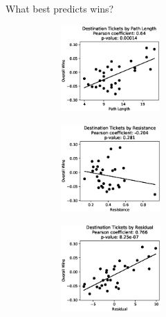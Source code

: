 \documentclass[12pt]{beamer}
\begin{document}
\begin{frame}{What best predicts wins?}
   \begin{figure}
    \centering
    \begin{subfigure}
        \centering
        \includegraphics[height=1.3in]{figures/correlation0}
    \end{subfigure}
    \begin{subfigure}
        \centering
        \includegraphics[height=1.3in]{figures/correlation1}
    \end{subfigure}
    \begin{subfigure}
        \centering
        \includegraphics[height=1.3in]{figures/correlation2}
    \end{subfigure}
    \end{figure} 
\end{frame}
\end{document}
